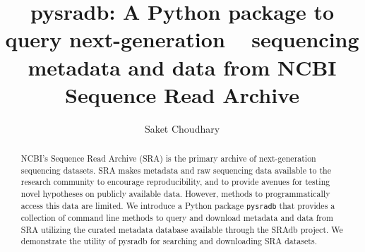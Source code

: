 \documentclass[9pt,a4paper]{extarticle}
\begin{document}
\pagestyle{front}
\title{pysradb: A Python package to query next-generation ~ sequencing metadata
and data from NCBI Sequence Read Archive}

\author[]{Saket Choudhary}


\maketitle
\thispagestyle{front}


\begin{abstract}





NCBI’s Sequence Read Archive (SRA) is the primary archive of next-generation 
sequencing datasets. SRA makes metadata and raw sequencing data available to the
research community to encourage reproducibility, and to provide avenues for 
testing novel hypotheses on publicly available data. However, methods to
programmatically access this data are limited. We introduce a
Python package \texttt{pysradb} that provides a collection of  command
line methods to query and download metadata and data from SRA utilizing the
curated metadata database available through the SRAdb project. We demonstrate 
the utility of pysradb for searching and downloading SRA datasets.


\end{abstract}
\end{document}
